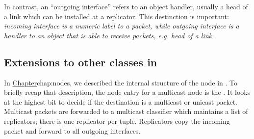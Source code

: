 In contrast, an ``outgoing interface'' refers to an object handler,
usually a head of a link which can be installed at a replicator.  This
destinction is important: \textit{incoming interface is a numeric label to
a packet, while outgoing interface is a handler to an object that is
able to receive packets, e.g. head of a link.}
 
\subsection{Extensions to other classes in \ns}
In \href{the earlier chapter describing nodes in
\ns}{Chapter}{chap:nodes}, we described the internal structure of the
node in \ns.  To briefly recap that description, the node entry for a
multicast node is the
.  It looks at the highest bit to decide if the
destination is a multicast or unicast packet.  Multicast packets are
forwarded to a multicast classifier which maintains a list of
replicators; there is one replicator per  tuple.
Replicators copy the incoming packet and forward to all outgoing
interfaces.

